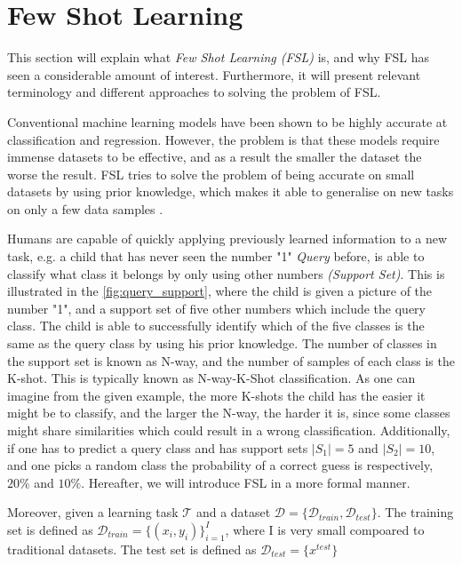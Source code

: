 \section{Few Shot Learning}
This section will explain what \textit{Few Shot Learning (FSL)} is, and why FSL has seen a considerable amount of interest. Furthermore, it will present relevant terminology and different approaches to solving the problem of FSL.

Conventional machine learning models have been shown to be highly accurate at classification and regression. However, the problem is that these models require immense datasets to be effective, and as a result the smaller the dataset the worse the result. FSL tries to solve the problem of being accurate on small datasets by using prior knowledge, which makes it able to generalise on new tasks on only a few data samples \cite{fsl2019}.

Humans are capable of quickly applying previously learned information to a new task, e.g. a child that has never seen the number "1" \textit{Query} before, is able to classify what class it belongs by only using other numbers \textit{(Support Set)}. This is illustrated in the \ref{fig:query_support}, where the child is given a picture of the number "1", and a support set of five other numbers which include the query class. The child is able to successfully identify which of the five classes is the same as the query class by using his prior knowledge. The number of classes in the support set is known as N-way, and the number of samples of each class is the K-shot. This is typically known as N-way-K-Shot classification. As one can imagine from the given example, the more K-shots the child has the easier it might be to classify, and the larger the N-way, the harder it is, since some classes might share similarities which could result in a wrong classification. Additionally, if one has to predict a query class and has support sets $|S_1| = 5$ and $|S_2| = 10$, and one picks a random class the probability of a correct guess is respectively, $20\%$ and $10\%$. Hereafter, we will introduce FSL in a more formal manner.

Moreover, given a learning task $\mathcal{T}$ and a dataset $\mathcal{D}=\{\mathcal{D}_{train}, \mathcal{D}_{test}\}$. The training set is defined as $\mathcal{D}_{train} = \{{(x_i, y_i)}\}^{I}_{i=1}$, where I is very small compoared to traditional datasets. The test set is defined as $\mathcal{D}_{test}=\{x^{test}\}$
 


